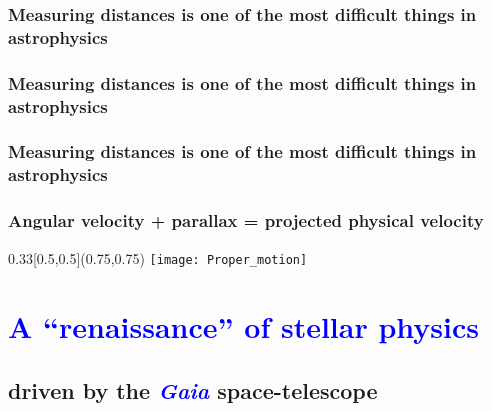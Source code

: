 \documentclass[xcolor=dvipsnames,professionalfonts, aspectratio=169]{beamer}
\begin{document}
\bgroup
\begin{frame}
  \frametitle{Measuring distances is one of the most difficult things
    in astrophysics}
\end{frame}

\egroup
\bgroup
\begin{frame}
  \frametitle{Measuring distances is one of the most difficult things
    in astrophysics}

\end{frame}
\egroup
\bgroup
\begin{frame}
  \frametitle{Measuring distances is one of the most difficult things
    in astrophysics}

\end{frame}
\egroup
\bgroup
\begin{frame}
  \frametitle{Angular velocity + parallax = projected physical velocity}

  \begin{textblock}{0.33}[0.5,0.5](0.75,0.75)
    \texttt{[image: Proper\_motion]}
  \end{textblock}


\end{frame}
\egroup




\section{\textcolor{Blue}{A ``renaissance'' of stellar physics}}
\subsection{driven by the \textcolor{Blue}{\emph{Gaia}} space-telescope}
\end{document}
